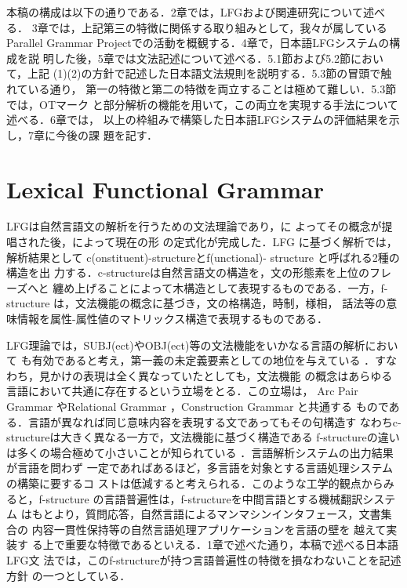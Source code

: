 本稿の構成は以下の通りである．2章では，LFGおよび関連研究について述べる．
3章では，上記第三の特徴に関係する取り組みとして，我々が属しているParallel 
Grammar Projectでの活動を概観する．4章で，日本語LFGシステムの構成を説
明した後，5章では文法記述について述べる．5.1節および5.2節において，上記
(1)(2)の方針で記述した日本語文法規則を説明する．5.3節の冒頭で触れている通り，
第一の特徴と第二の特徴を両立することは極めて難しい．5.3節では，OTマーク
と部分解析の機能を用いて，この両立を実現する手法について述べる．6章では，
以上の枠組みで構築した日本語LFGシステムの評価結果を示し，7章に今後の課
題を記す．

\section{Lexical Functional Grammar}
LFGは自然言語文の解析を行うための文法理論であり，\cite{B1978}に
よってその概念が提唱された後，\cite{KandB1982}によって現在の形
の定式化が完成した．LFG に基づく解析では，解析結果として
c(onstituent)-structureとf(unctional)- structure と呼ばれる2種の構造を出
力する．c-structureは自然言語文の構造を，文の形態素を上位のフレーズへと
纏め上げることによって木構造として表現するものである．一方，f-structure
は，文法機能の概念に基づき，文の格構造，時制，様相，
話法等の意味情報を属性-属性値のマトリックス構造で表現するものである．

LFG理論では，SUBJ(ect)やOBJ(ect)等の文法機能をいかなる言語の解析において
も有効であると考え，第一義の未定義要素としての地位を与えている
\cite{S1985}．すなわち，見かけの表現は全く異なっていたとしても，文法機能
の概念はあらゆる言語において共通に存在するという立場をとる．この立場は，
Arc Pair Grammar \cite{JandP1980}やRelational Grammar
\cite{PandP1983}，Construction Grammar \cite{Kay1998}と共通する
ものである．言語が異なれば同じ意味内容を表現する文であってもその句構造す
なわちc-structureは大きく異なる一方で，文法機能に基づく構造である
f-structureの違いは多くの場合極めて小さいことが知られている
\cite{B1999a,D2001}．言語解析システムの出力結果が言語を問わず
一定であればあるほど，多言語を対象とする言語処理システムの構築に要するコ
ストは低減すると考えられる．このような工学的観点からみると，f-structure
の言語普遍性は，f-structureを中間言語とする機械翻訳システム\cite{F1999}
はもとより，質問応答，自然言語によるマンマシンインタフェース，文書集合の
内容一貫性保持\cite{E2002}等の自然言語処理アプリケーションを言語の壁を
越えて実装す
る上で重要な特徴であるといえる．1章で述べた通り，本稿で述べる日本語LFG文
法では，このf-structureが持つ言語普遍性の特徴を損なわないことを記述方針
の一つとしている．

